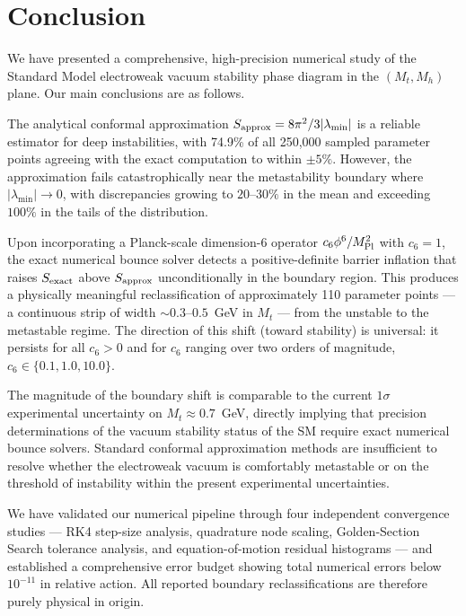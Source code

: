 \documentclass[aps,prd,twocolumn,superscriptaddress,nofootinbib]{revtex4-2}
\begin{document}
\section{Conclusion}
\label{sec:conclusion}

We have presented a comprehensive, high-precision numerical study of the
Standard Model electroweak vacuum stability phase diagram in the $(M_t, M_h)$
plane. Our main conclusions are as follows.

The analytical conformal approximation $S_{\rm approx} = 8\pi^2/3|\lambda_{\min}|$
is a reliable estimator for deep instabilities, with 74.9\% of all 250,000
sampled parameter points agreeing with the exact computation to within
$\pm 5\%$. However, the approximation fails catastrophically near the
metastability boundary where $|\lambda_{\min}| \to 0$, with discrepancies
growing to $20$--$30\%$ in the mean and exceeding $100\%$ in the tails of
the distribution.

Upon incorporating a Planck-scale dimension-6 operator
$c_6\phi^6/M_{\rm Pl}^2$ with $c_6 = 1$, the exact numerical bounce
solver detects a positive-definite barrier inflation that raises
$S_{\rm exact}$ above $S_{\rm approx}$ unconditionally in the boundary
region. This produces a physically meaningful reclassification of
approximately 110 parameter points — a continuous strip of width
$\sim 0.3$--$0.5$~GeV in $M_t$ — from the unstable to the metastable
regime. The direction of this shift (toward stability) is universal: it
persists for all $c_6 > 0$ and for $c_6$ ranging over two orders of
magnitude, $c_6 \in \{0.1, 1.0, 10.0\}$.

The magnitude of the boundary shift is comparable to the current $1\sigma$
experimental uncertainty on $M_t \approx 0.7$~GeV, directly implying that
precision determinations of the vacuum stability status of the SM require
exact numerical bounce solvers. Standard conformal approximation methods
are insufficient to resolve whether the electroweak vacuum is comfortably
metastable or on the threshold of instability within the present experimental
uncertainties.

We have validated our numerical pipeline through four independent
convergence studies — RK4 step-size analysis, quadrature node scaling,
Golden-Section Search tolerance analysis, and equation-of-motion residual
histograms — and established a comprehensive error budget showing total
numerical errors below $10^{-11}$ in relative action. All reported boundary
reclassifications are therefore purely physical in origin.
\end{document}
